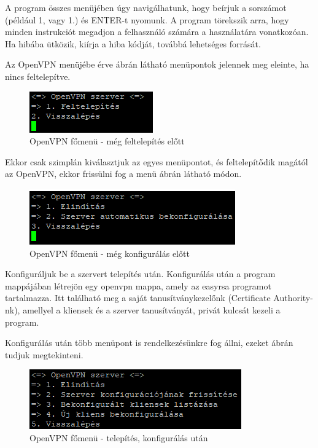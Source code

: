A program összes menüjében úgy navigálhatunk, hogy beírjuk a sorszámot (például 1, vagy 1.) és ENTER-t nyomunk. A program törekszik arra, hogy minden instrukciót megadjon a felhasználó számára a használatára vonatkozóan. Ha hibába ütközik, kiírja a hiba kódját, továbbá lehetséges forrását.

\pagebreak


Az OpenVPN menüjébe érve  ábrán látható menüpontok jelennek meg eleinte, ha nincs feltelepítve.

\begin{figure}[h]
\centering
\includegraphics[scale=1]{images/openvpn_install.png}
\caption{OpenVPN főmenü - még feltelepítés előtt}
\label{fig:openvpn_before_install}
\end{figure}

Ekkor csak szimplán kiválasztjuk az egyes menüpontot, és feltelepítődik magától az OpenVPN, ekkor frissülni fog a menü  ábrán látható módon.

\begin{figure}[h]
\centering
\includegraphics[scale=1]{images/openvpn_preconfig.png}
\caption{OpenVPN főmenü - még konfigurálás előtt}
\label{fig:openvpn_preconfig}
\end{figure}

Konfiguráljuk be a szervert telepítés után. Konfigurálás után a program mappájában létrejön egy openvpn mappa, amely az easyrsa programot tartalmazza. Itt található meg a saját tanusítványkezelőnk (Certificate Authority-nk), amellyel a kliensek és a szerver tanusítványát, privát kulcsát kezeli a program.

Konfigurálás után több menüpont is rendelkezésünkre fog állni, ezeket  ábrán tudjuk megtekinteni.

\begin{figure}[h]
\centering
\includegraphics[scale=1]{images/openvpn_after_install.png}
\caption{OpenVPN főmenü - telepítés, konfigurálás után}
\label{fig:openvpn_after_install}
\end{figure}

